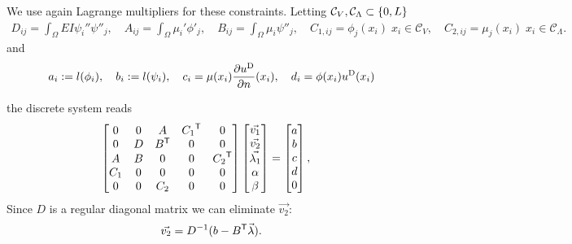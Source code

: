 %
We use again Lagrange multipliers for these constraints. Letting $\mathcal C_V,\mathcal C_{\Lambda}\subset\left\{0,L\right\}$
%
\begin{align*}
D_{ij} = \int_{\Omega} EI\psi_i''\psi''_j,\quad
A_{ij} = \int_{\Omega} \mu_i'\phi'_j,\quad
B_{ij} = \int_{\Omega} \mu_i\psi''_j,\quad
C_{1,ij} = \phi_j(x_i)\; x_i\in\mathcal C_V,\quad
C_{2,ij} = \mu_j(x_i)\; x_i\in\mathcal C_{\Lambda}.
\end{align*}
%
and
%
\begin{align*}
a_i := l(\phi_i), \quad b_i:=l(\psi_i),\quad  c_i = \mu(x_i)\frac{\partial u^{\rm D}}{\partial n}(x_i),\quad d_i = \phi(x_i)u^{\rm D}(x_i)
\end{align*}
%

the discrete system reads
%
\begin{equation}\label{eq:}
\begin{bmatrix}
0 & 0 & A& {C_1}^{\mathsf{T}}&0\\
0 & D & {B}^{\mathsf{T}}& 0&0\\
A & B & 0 & 0&{C_2}^{\mathsf{T}}\\
C_1 & 0 & 0 & 0&0\\
0 & 0 & C_2 & 0&0\\
\end{bmatrix}
\begin{bmatrix}
\vec{v_1} \\ \vec{v_2} \\ \vec{\lambda_1}\\ \alpha \\ \beta
\end{bmatrix}
=
\begin{bmatrix}
a \\ b \\ c\\ d\\0
\end{bmatrix},\quad
\end{equation}
%
%
Since $D$ is a regular diagonal matrix we can eliminate $\vec{v_2}$:
%
\begin{align*}
\vec{v_2} = D^{-1}(b-{B}^{\mathsf{T}}\vec{\lambda}).
\end{align*}
%

